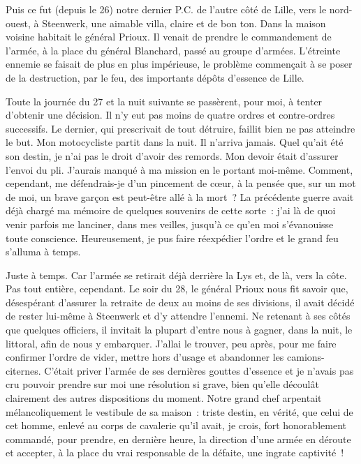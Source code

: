 \documentclass[french,twoside]{book} %
\begin{document}
Puis ce fut (depuis le 26) notre dernier P.C. de l’autre côté de Lille, vers le nord-ouest, à Steenwerk, une aimable villa, claire et de bon ton. Dans la maison voisine habitait le général Prioux. Il venait de prendre le commandement de l’armée, à la place du général Blanchard, passé au groupe d’armées. L’étreinte ennemie se faisait de plus en plus impérieuse, le problème commençait à se poser de la destruction, par le feu, des importants dépôts d’essence de Lille.\par
Toute la journée du 27 et la nuit suivante se passèrent, pour moi, à tenter d’obtenir une décision. Il n’y eut pas moins de quatre ordres et contre-ordres successifs. Le dernier, qui prescrivait de tout détruire, faillit bien ne pas atteindre le but. Mon motocycliste partit dans la nuit. Il n’arriva jamais. Quel qu’ait été son destin, je n’ai pas le droit d’avoir des remords. Mon devoir était d’assurer l’envoi du pli. J’aurais manqué à ma mission en le portant moi-même. Comment, cependant, me défendrais-je d’un pincement de cœur, à la pensée que, sur un mot de moi, un brave garçon est peut-être allé à la mort ? La précédente guerre avait déjà chargé ma mémoire de quelques souvenirs de cette sorte : j’ai là de quoi venir parfois me lanciner, dans mes veilles, jusqu’à ce qu’en moi s’évanouisse toute conscience. Heureusement, je pus faire réexpédier l’ordre et le grand feu s’alluma à temps.\par
Juste à temps. Car l’armée se retirait déjà   derrière la Lys et, de là, vers la côte. Pas tout entière, cependant. Le soir du 28, le général Prioux nous fit savoir que, désespérant d’assurer la retraite de deux au moins de ses divisions, il avait décidé de rester lui-même à Steenwerk et d’y attendre l’ennemi. Ne retenant à ses côtés que quelques officiers, il invitait la plupart d’entre nous à gagner, dans la nuit, le littoral, afin de nous y embarquer. J’allai le trouver, peu après, pour me faire confirmer l’ordre de vider, mettre hors d’usage et abandonner les camions-citernes. C’était priver l’armée de ses dernières gouttes d’essence et je n’avais pas cru pouvoir prendre sur moi une résolution si grave, bien qu’elle découlât clairement des autres dispositions du moment. Notre grand chef arpentait mélancoliquement le vestibule de sa maison : triste destin, en vérité, que celui de cet homme, enlevé au corps de cavalerie qu’il avait, je crois, fort honorablement commandé, pour prendre, en dernière heure, la direction d’une armée en déroute et accepter, à la place du vrai responsable de la défaite, une ingrate captivité !\par
\end{document}
